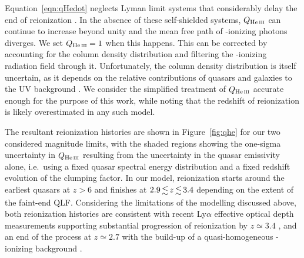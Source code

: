 \documentclass[fleqn,usenatbib]{mnras}
\begin{document}
Equation~\eqref{eqn:qHedot} neglects  Lyman limit systems
that considerably delay the end of  reionization
\citep{2009MNRAS.395..736B, 2017ApJ...851...50M}.  In the absence of
these self-shielded systems, $Q_\ion{He}{iii}$ can continue to
increase beyond unity and the mean free path of -ionizing
photons diverges.  We set $Q_\ion{He}{iii}=1$ when this happens.  This
can be corrected by accounting for the  column density
distribution and filtering the -ionizing radiation field
through it. Unfortunately, the  column density
distribution is itself uncertain, as it depends on the relative
contributions of quasars and galaxies to the UV background
\citep[e.g.][]{2012ApJ...746..125H,2018arXiv180104931P}.  We consider
the simplified treatment of $Q_\ion{He}{iii}$ accurate enough for the
purpose of this work, while noting that the redshift of 
reionization is likely overestimated in any such model.

The resultant  reionization histories are shown in
Figure~\ref{fig:qhe} for our two considered magnitude limits, with the
shaded regions showing the one-sigma uncertainty in $Q_\ion{He}{iii}$
resulting from the uncertainty in the quasar emissivity alone,
i.e.\ using a fixed quasar spectral energy distribution and a fixed
redshift evolution of the clumping factor.  In our model, 
reionization starts around the earliest quasars at $z>6$ and finishes
at $2.9\la z\la 3.4$ depending on the extent of the faint-end QLF.
Considering the limitations of the modelling discussed above, both
 reionization histories are consistent with recent
 Ly$\alpha$ effective optical depth measurements
supporting substantial progression of  reionization by
$z\simeq 3.4$ \citep{2016ApJ...825..144W}, and an end of the process
at $z\simeq 2.7$ \citep{2011ApJ...733L..24W,2016ApJ...825..144W} with
the build-up of a quasi-homogeneous -ionizing background
\citep{2014MNRAS.437.1141D,2017MNRAS.465.2886D}.
\end{document}
